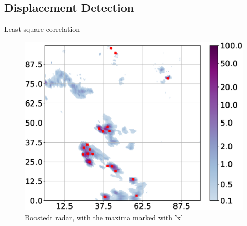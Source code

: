 \documentclass[11pt,twoside,a4paper,fleqn]{report}
\numberwithin{equation}{chapter}
\numberwithin{figure}{chapter}
\numberwithin{table}{chapter}
\begin{document}
\subsection{Displacement Detection}
Least square correlation
\begin{figure}
	\centering
	\includegraphics[width=\textwidth]{maximaOverview.eps}
	\caption{Boostedt radar, with the maxima marked with 'x'}
\end{figure}
\end{document}
